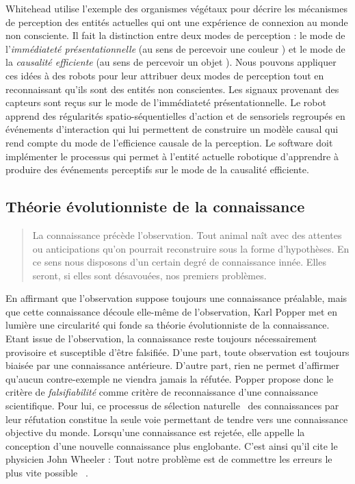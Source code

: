 Whitehead utilise l'exemple des organismes végétaux pour décrire les mécanismes de perception des entités actuelles qui ont une expérience de connexion au monde non consciente. 
Il fait la distinction entre deux modes de perception : le mode de l'\emph{immédiateté présentationnelle} (au sens de \og percevoir une couleur \fg) et le mode de la \emph{causalité efficiente} (au sens de \og percevoir un objet \fg). 
Nous pouvons appliquer ces idées à des robots pour leur attribuer deux modes de perception tout en reconnaissant qu'ils sont des entités non conscientes. 
Les signaux provenant des capteurs sont reçus sur le mode de l'immédiateté présentationnelle.
Le robot apprend des régularités spatio-séquentielles d'action et de  sensoriels regroupés en événements d'interaction qui lui permettent de construire un modèle causal qui rend compte du mode de l'efficience causale de la perception.
Le software doit implémenter le processus qui permet à l'entité actuelle robotique d'apprendre à produire des événements perceptifs sur le mode de la causalité efficiente.


\subsection{Théorie évolutionniste de la connaissance}
\label{sec:popper}

\begin{quote}
	\og La connaissance précède l'observation. 
	Tout animal naît avec des attentes ou anticipations qu'on pourrait reconstruire sous la forme d'hypothèses. 
	En ce sens nous disposons d'un certain degré de connaissance innée. 
	Elles seront, si elles sont désavouées, nos premiers problèmes. \fg\ 
	\cite[p.~389]{popper_connaissance_1979}
\end{quote}

\noindent
En affirmant que l'observation suppose toujours une connaissance préalable, mais que cette connaissance découle elle-même de l'observation, Karl Popper met en lumière une circularité qui fonde sa théorie évolutionniste de la connaissance. 
Etant issue de l’observation, la connaissance reste toujours nécessairement provisoire et susceptible d'être falsifiée. 
D'une part, toute observation est toujours biaisée par une connaissance antérieure. 
D'autre part, rien ne permet d’affirmer qu'aucun contre-exemple ne viendra jamais la réfutée. 
Popper propose donc le critère de \emph{falsifiabilité} comme critère de reconnaissance d'une connaissance scientifique. 
Pour lui, ce processus de \og sélection naturelle \fg\ des connaissances par leur réfutation constitue la seule voie permettant de tendre vers une connaissance objective du monde. 
Lorsqu'une connaissance est rejetée, elle appelle la conception d’une nouvelle connaissance plus englobante. 
C’est ainsi qu’il cite le physicien John Wheeler : \og Tout notre problème est de commettre les erreurs le plus vite possible \fg\ \cite{popper_connaissance_1979}.

